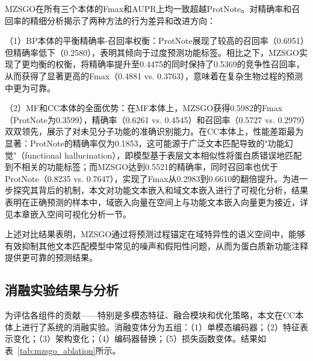 MZSGO在所有三个本体的Fmax和AUPR上均一致超越ProtNote。对精确率和召回率的精细分析揭示了两种方法的行为差异和改进方向：

（1）BP本体的平衡精确率-召回率权衡：ProtNote展现了较高的召回率（0.6951）但精确率低下（0.2580），表明其倾向于过度预测功能标签。相比之下，MZSGO实现了更均衡的权衡，将精确率提升至0.4475的同时保持了0.5369的竞争性召回率，从而获得了显著更高的Fmax（0.4881 vs. 0.3763），意味着在复杂生物过程的预测中更为可靠。

（2）MF和CC本体的全面优势：在MF本体上，MZSGO获得0.5982的Fmax（ProtNote为0.3599），精确率（0.6261 vs. 0.4545）和召回率（0.5727 vs. 0.2979）双双领先，展示了对未见分子功能的准确识别能力。在CC本体上，性能差距最为显著：ProtNote的精确率仅为0.1853，这可能源于广泛文本匹配导致的"功能幻觉"（functional hallucination），即模型基于表层文本相似性将蛋白质错误地匹配到不相关的功能标签；而MZSGO达到0.5521的精确率，同时召回率也优于ProtNote（0.8235 vs. 0.7647），实现了Fmax从0.2983到0.6610的翻倍提升。为进一步探究其背后的机制，本文对功能文本嵌入和域文本嵌入进行了可视化分析，结果表明在正确预测的样本中，域嵌入向量在空间上与功能文本嵌入向量更为接近，详见本章嵌入空间可视化分析一节。

上述对比结果表明，MZSGO通过将预测过程锚定在域特异性的语义空间中，能够有效抑制其他文本匹配模型中常见的噪声和假阳性问题，从而为蛋白质新功能注释提供更可靠的预测结果。

\subsection{消融实验结果与分析}

为评估各组件的贡献——特别是多模态特征、融合模块和优化策略，本文在CC本体上进行了系统的消融实验。消融变体分为五组：（1）单模态编码器；（2）特征表示变化；（3）架构变化；（4）编码器替换；（5）损失函数变体。结果如表~\ref{tab:mzsgo_ablation}所示。

